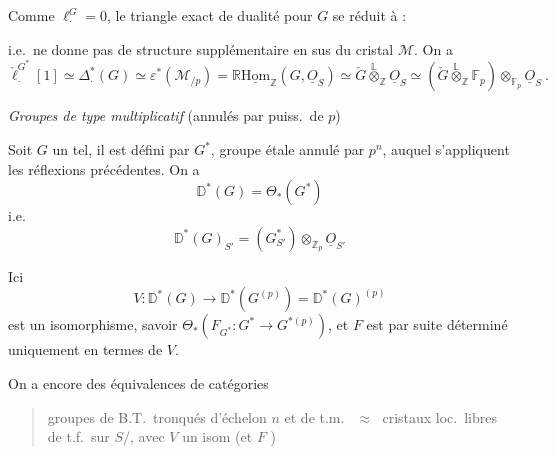 \documentclass[11pt,a4paper]{article}
\begin{document}
Comme $\ell^{G}_{\cdot}=0$, le triangle exact de dualité pour $G$ se réduit
à :


i.e.\ ne donne pas de structure supplémentaire \struck{\ill{}} en sus
\ill{} du cristal $\mathcal{M}$. On a
\[
  \check{\ell}^{G^*}_{\cdot}[1]\simeq\Delta^{*}_{\cdot}(G)\simeq
  \varepsilon^{*}(\mathcal{M}_{/p})=
  \mathbb{R}\underline{\mathrm{Hom}}_{\mathbb{Z}}(G,\underline{O}_S)
  \simeq\check{G}\overset{\mathbb{L}}{\otimes}_{\mathbb{Z}}\underline{O}_S
  \simeq(\check{G}\overset{\mathbb{L}}{\otimes}_{\mathbb{Z}}\mathbb{F}_p)
  \otimes_{\mathbb{F}_p}\underline{O}_S\ .
\]

\emph{Groupes de type multiplicatif} (annulés par puiss.\ de $p$)

Soit $G$ \struck{\ill{}} un tel, il est défini par $G^*$, groupe étale annulé
par $p^n$, auquel s'appliquent les réflexions précédentes. On a
\[
  \mathbb{D}^*(G)=\Theta_{*}(G^*)
\]
i.e.
\[
  \mathbb{D}^*(G)_{S'}=(G^*_{S'})\otimes_{\mathbb{Z}_p}\underline{O}_{S'}
\]

Ici
\[
  V\colon\mathbb{D}^*(G)\longrightarrow\mathbb{D}^*(G^{(p)})=\mathbb{D}^*(G)^{(p)}
\]
est un isomorphisme, savoir
$\Theta_{*}(F_{G^*}\colon G^*\to G^{*(p)})$, et $F$ est par suite déterminé
uniquement en termes de $V$.

On a encore des équivalences de catégories
\begin{quote}
groupes de B.T.\ tronqués d'échelon $n$ et de t.m.\ $\;\approx\;$ cristaux
loc.\ libres de t.f.\ sur $S/$, avec $V$ un isom
(et $F$ )
\end{quote}
\end{document}
